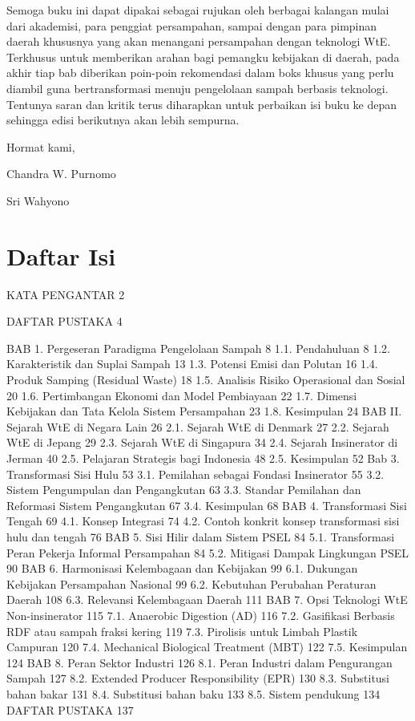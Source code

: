 \documentclass[
  letterpaper,
  DIV=11,
  numbers=noendperiod]{scrreprt}
\begin{document}
Semoga buku ini dapat dipakai sebagai rujukan oleh berbagai kalangan
mulai dari akademisi, para penggiat persampahan, sampai dengan para
pimpinan daerah khususnya yang akan menangani persampahan dengan
teknologi WtE. Terkhusus untuk memberikan arahan bagi pemangku kebijakan
di daerah, pada akhir tiap bab diberikan poin-poin rekomendasi dalam
boks khusus yang perlu diambil guna bertransformasi menuju pengelolaan
sampah berbasis teknologi. Tentunya saran dan kritik terus diharapkan
untuk perbaikan isi buku ke depan sehingga edisi berikutnya akan lebih
sempurna.

Hormat kami,

Chandra W. Purnomo

Sri Wahyono


\chapter*{Daftar Isi}\label{daftar-isi}


KATA PENGANTAR 2

DAFTAR PUSTAKA 4

BAB 1. Pergeseran Paradigma Pengelolaan Sampah 8 1.1. Pendahuluan 8 1.2.
Karakteristik dan Suplai Sampah 13 1.3. Potensi Emisi dan Polutan 16
1.4. Produk Samping (Residual Waste) 18 1.5. Analisis Risiko Operasional
dan Sosial 20 1.6. Pertimbangan Ekonomi dan Model Pembiayaan 22 1.7.
Dimensi Kebijakan dan Tata Kelola Sistem Persampahan 23 1.8. Kesimpulan
24 BAB II. Sejarah WtE di Negara Lain 26 2.1. Sejarah WtE di Denmark 27
2.2. Sejarah WtE di Jepang 29 2.3. Sejarah WtE di Singapura 34 2.4.
Sejarah Insinerator di Jerman 40 2.5. Pelajaran Strategis bagi Indonesia
48 2.5. Kesimpulan 52 Bab 3. Transformasi Sisi Hulu 53 3.1. Pemilahan
sebagai Fondasi Insinerator 55 3.2. Sistem Pengumpulan dan Pengangkutan
63 3.3. Standar Pemilahan dan Reformasi Sistem Pengangkutan 67 3.4.
Kesimpulan 68 BAB 4. Transformasi Sisi Tengah 69 4.1. Konsep Integrasi
74 4.2. Contoh konkrit konsep transformasi sisi hulu dan tengah 76 BAB
5. Sisi Hilir dalam Sistem PSEL 84 5.1. Transformasi Peran Pekerja
Informal Persampahan 84 5.2. Mitigasi Dampak Lingkungan PSEL 90 BAB 6.
Harmonisasi Kelembagaan dan Kebijakan 99 6.1. Dukungan Kebijakan
Persampahan Nasional 99 6.2. Kebutuhan Perubahan Peraturan Daerah 108
6.3. Relevansi Kelembagaan Daerah 111 BAB 7. Opsi Teknologi WtE
Non-insinerator 115 7.1. Anaerobic Digestion (AD) 116 7.2. Gasifikasi
Berbasis RDF atau sampah fraksi kering 119 7.3. Pirolisis untuk Limbah
Plastik Campuran 120 7.4. Mechanical Biological Treatment (MBT) 122 7.5.
Kesimpulan 124 BAB 8. Peran Sektor Industri 126 8.1. Peran Industri
dalam Pengurangan Sampah 127 8.2. Extended Producer Responsibility (EPR)
130 8.3. Substitusi bahan bakar 131 8.4. Substitusi bahan baku 133 8.5.
Sistem pendukung 134 DAFTAR PUSTAKA 137
\end{document}
